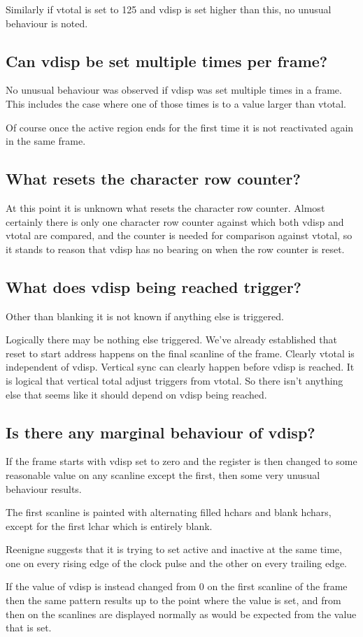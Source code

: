 \documentclass[a4paper,10pt]{amsart}
\begin{document}
Similarly if vtotal is set to 125 and vdisp is set higher than this, no unusual
behaviour is noted.

\subsection{Can vdisp be set multiple times per frame?}

No unusual behaviour was observed if vdisp was set multiple times in a frame.
This includes the case where one of those times is to a value larger than
vtotal.

Of course once the active region ends for the first time it is not reactivated
again in the same frame.

\subsection{What resets the character row counter?}

At this point it is unknown what resets the character row counter. Almost
certainly there is only one character row counter against which both vdisp and
vtotal are compared, and the counter is needed for comparison against vtotal,
so it stands to reason that vdisp has no bearing on when the row counter is
reset.

\subsection{What does vdisp being reached trigger?}

Other than blanking it is not known if anything else is triggered.

Logically there may be nothing else triggered. We've already established that
reset to start address happens on the final scanline of the frame. Clearly
vtotal is independent of vdisp. Vertical sync can clearly happen before vdisp
is reached. It is logical that vertical total adjust triggers from vtotal. So
there isn't anything else that seems like it should depend on vdisp being
reached.

\subsection{Is there any marginal behaviour of vdisp?}

If the frame starts with vdisp set to zero and the register is then changed to
some reasonable value on any scanline except the first, then some very unusual
behaviour results.

The first scanline is painted with alternating filled hchars and blank hchars,
except for the first lchar which is entirely blank.

Reenigne suggests that it is trying to set active and inactive at the same
time, one on every rising edge of the clock pulse and the other on every
trailing edge.

If the value of vdisp is instead changed from 0 on the first scanline of the
frame then the same pattern results up to the point where the value is set, and
from then on the scanlines are displayed normally as would be expected from the
value that is set.
\end{document}
